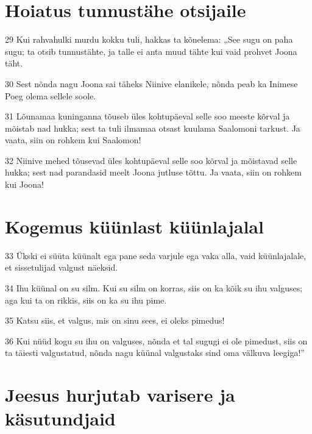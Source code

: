 \section*{Hoiatus tunnustähe otsijaile}

\par 29 Kui rahvahulki murdu kokku tuli, hakkas ta kõnelema: „See sugu on paha sugu; ta otsib tunnustähte, ja talle ei anta muud tähte kui vaid prohvet Joona täht.
\par 30 Sest nõnda nagu Joona sai täheks Niinive elanikele, nõnda peab ka Inimese Poeg olema sellele soole.
\par 31 Lõunamaa kuninganna tõuseb üles kohtupäeval selle soo meeste kõrval ja mõistab nad hukka; sest ta tuli ilmamaa otsast kuulama Saalomoni tarkust. Ja vaata, siin on rohkem kui Saalomon!
\par 32 Niinive mehed tõusevad üles kohtupäeval selle soo kõrval ja mõistavad selle hukka; sest nad parandasid meelt Joona jutluse tõttu. Ja vaata, siin on rohkem kui Joona!

\section*{Kogemus küünlast küünlajalal}

\par 33 Ükski ei süüta küünalt ega pane seda varjule ega vaka alla, vaid küünlajalale, et sissetulijad valgust näeksid.
\par 34 Ihu küünal on su silm. Kui su silm on korras, siis on ka kõik su ihu valguses; aga kui ta on rikkis, siis on ka su ihu pime.
\par 35 Katsu siis, et valgus, mis on sinu sees, ei oleks pimedus!
\par 36 Kui nüüd kogu su ihu on valguses, nõnda et tal sugugi ei ole pimedust, siis on ta täiesti valgustatud, nõnda nagu küünal valgustaks sind oma välkuva leegiga!”

\section*{Jeesus hurjutab varisere ja käsutundjaid}

